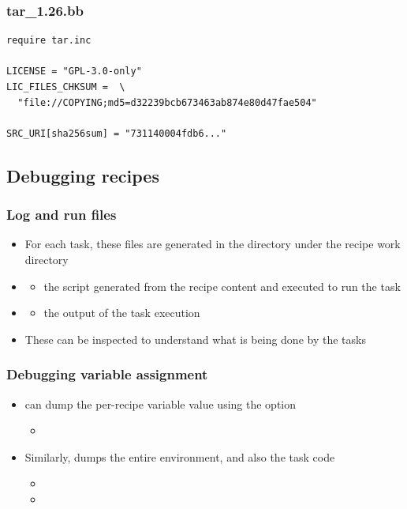 \begin{frame}[fragile]
  \frametitle{tar\_1.26.bb}
  \begin{block}{}
    \begin{verbatim}
require tar.inc

LICENSE = "GPL-3.0-only"
LIC_FILES_CHKSUM =  \
  "file://COPYING;md5=d32239bcb673463ab874e80d47fae504"

SRC_URI[sha256sum] = "731140004fdb6..."
    \end{verbatim}
  \end{block}
\end{frame}

\subsection{Debugging recipes}

\begin{frame}
  \frametitle{Log and run files}
  \begin{itemize}
    \item For each task, these files are generated in the 
      directory under the recipe work directory
    \item {}
      \begin{itemize}
      \item the script generated from the recipe content and executed to
        run the task
      \end{itemize}
    \item {}
      \begin{itemize}
      \item the output of the task execution
      \end{itemize}
    \item These can be inspected to understand what is being done by the
      tasks
  \end{itemize}
\end{frame}

\begin{frame}[fragile]
  \frametitle{Debugging variable assignment}
  \begin{itemize}
    \item {} can dump the per-recipe variable value
      using the \code{-r} option
      \begin{itemize}
      \item {}
      \end{itemize}
    \item Similarly,  dumps the entire environment, and
      also the task code
      \begin{itemize}
      \item {}
      \item {}
      \end{itemize}
  \end{itemize}
\end{frame}
